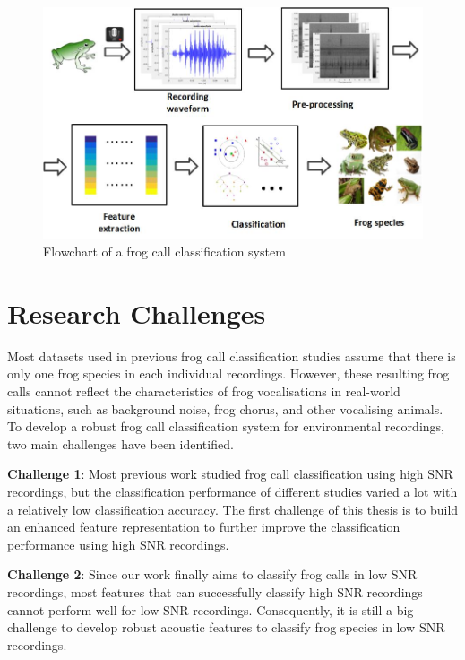 \begin{figure}[htb!]
\centering
\includegraphics[width=\textwidth]{image/Ch1/flowchart.jpg}
\caption[Flowchart of a frog call classification system]{Flowchart of a frog call classification system}
\label{fig:Ch1_flowchart}
\end{figure}


\section{Research Challenges}
Most datasets used in previous frog call classification studies assume that there is only one frog species in each individual recordings. However, these resulting frog calls cannot reflect the characteristics of frog vocalisations in real-world situations, such as background noise, frog chorus, and other vocalising animals. To develop a robust frog call classification system for environmental recordings, two main challenges have been identified. 


\noindent \textbf{Challenge 1}: Most previous work studied frog call classification using high SNR recordings, but the classification performance of different studies varied a lot with a relatively low classification accuracy. The first challenge of this thesis is to build an enhanced feature representation to further improve the classification performance using high SNR recordings. 

\noindent \textbf{Challenge 2}: Since our work finally aims to classify frog calls in low SNR recordings, most features that can successfully classify high SNR recordings cannot perform well for low SNR recordings. Consequently, it is still a big challenge to develop robust acoustic features to classify frog species in low SNR recordings. 

